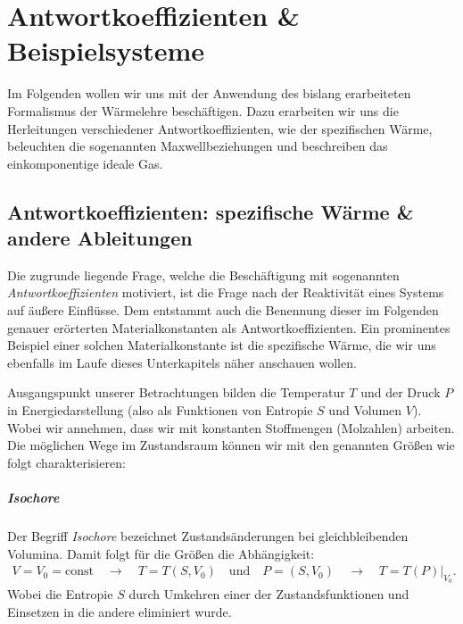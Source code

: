 \chapter{Antwortkoeffizienten \& Beispielsysteme}
Im Folgenden wollen wir uns mit der Anwendung des bislang erarbeiteten Formalismus der Wärmelehre beschäftigen. Dazu erarbeiten wir uns die Herleitungen verschiedener Antwortkoeffizienten, wie der spezifischen Wärme, beleuchten die sogenannten Maxwellbeziehungen und beschreiben das einkomponentige ideale Gas.  
\section{Antwortkoeffizienten: spezifische Wärme \& andere Ableitungen}
Die zugrunde liegende Frage, welche die Beschäftigung mit sogenannten \emph{Antwortkoeffizienten} motiviert, ist die Frage nach der Reaktivität eines Systems auf äußere Einflüsse. Dem entstammt auch die Benennung dieser \textendash{} im Folgenden genauer erörterten \textendash{} Materialkonstanten als Antwortkoeffizienten. 
Ein prominentes Beispiel einer solchen Materialkonstante ist die spezifische Wärme, die wir uns ebenfalls im Laufe dieses Unterkapitels näher anschauen wollen.


Ausgangspunkt unserer Betrachtungen bilden die Temperatur $T$ und der Druck $P$ in Energiedarstellung (also als Funktionen von Entropie $S$ und Volumen $V$). Wobei wir annehmen, dass wir mit konstanten Stoffmengen (Molzahlen) arbeiten.  Die möglichen Wege im Zustandsraum können wir mit den genannten Größen wie folgt charakterisieren: 


\paragraph*{Isochore}
Der Begriff \emph{Isochore} bezeichnet Zustandsänderungen bei gleichbleibenden Volumina. Damit folgt für die Größen die Abhängigkeit: 
\begin{align*}
    V=V_0=\mathrm{const}\quad\rightarrow\quad T=T(S,V_0) \quad\text{und}\quad P=(S,V_0) \quad\rightarrow\quad T=T(P)|_{V_0}.
\end{align*}
Wobei die Entropie $S$ durch Umkehren einer der Zustandsfunktionen und Einsetzen in die andere eliminiert wurde.



